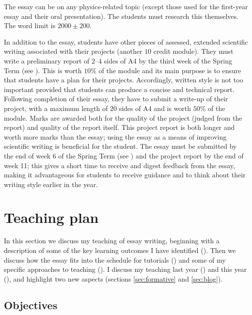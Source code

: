 The essay can be on any physics-related topic (except those used for the first-year essay and their oral presentation). The students must research this themselves. The word limit is $2000 \pm 200$. 

In addition to the essay, students have other pieces of assessed, extended scientific writing associated with their projects (another $10$ credit module). They must write a preliminary report of $2$--$4$ sides of A4 by the third week of the Spring Term (see ). This is worth $10\%$ of the module and its main purpose is to ensure that students have a plan for their projects. Accordingly, written style is not too important provided that students can produce a concise and technical report. Following completion of their essay, they have to submit a write-up of their project, with a maximum length of $20$ sides of A4 and is worth $50\%$ of the module. Marks are awarded both for the quality of the project (judged from the report) and quality of the report itself. This project report is both longer and worth more marks than the essay; using the essay as a means of improving scientific writing is beneficial for the student. The essay must be submitted by the end of week 6 of the Spring Term (see ) and the project report by the end of week 11; this gives a short time to receive and digest feedback from the essay, making it advantageous for students to receive guidance and to think about their writing style earlier in the year.


\section{Teaching plan}\label{sec:essay-teach}

In this section we discuss my teaching of essay writing, beginning with a description of some of the key learning outcomes I have identified (). Then we discuss how the essay fits into the schedule for tutorials () and some of my specific approaches to teaching (). I discuss my teaching last year () and this year (), and highlight two new aspects (sections \ref{sec:formative} and \ref{sec:blog}).

\subsection{Objectives}\label{sec:essay-aims}

